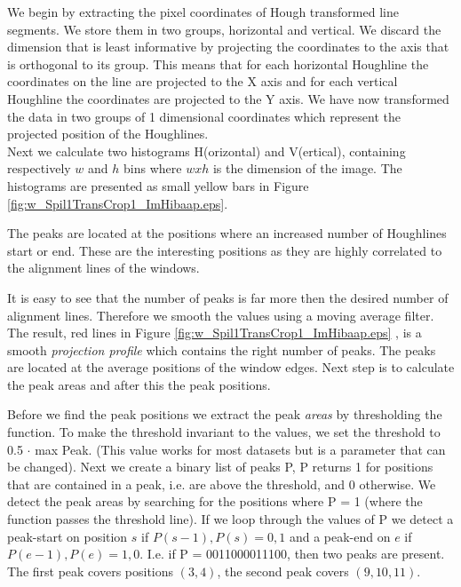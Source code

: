 We begin by extracting the pixel coordinates of Hough transformed line
segments. We store them in two groups, horizontal and vertical.%
We discard the dimension that is least informative by projecting the coordinates to
the axis that is orthogonal to its group. 
This means that for each horizontal Houghline the coordinates on the line are projected to the X
axis and for each vertical Houghline the coordinates are projected to the Y
axis. We have now transformed the data in two groups of 1 dimensional
coordinates which represent the projected position of the Houghlines.\\

Next we calculate two histograms H(orizontal) and V(ertical), containing respectively
$w$ and $h$ bins where $w x h$ is the dimension of the image.  The histograms
are presented as small yellow bars in Figure \ref{fig:w_Spil1TransCrop1_ImHibaap.eps}.

The peaks are located at the positions where an increased number of Houghlines
start or end.  These are the interesting positions as they are highly correlated
to the alignment lines of the windows. 

It is easy to see that the number of peaks is far more then the desired number of alignment lines.
Therefore we smooth the values using a moving average filter.
The result, red lines in Figure \ref{fig:w_Spil1TransCrop1_ImHibaap.eps}
, is a smooth \emph{projection profile} which contains the right number of peaks. The peaks
are located at the average positions of the window edges. Next step is to
calculate the peak areas and after this the peak positions. 

Before we find the peak positions we extract the peak \emph{areas} by thresholding the
function. To make the threshold invariant to the values, we set the threshold to 0.5 $\cdot$ max Peak. 
(This value works for most datasets but is a parameter that can be changed).
Next we create a binary list of peaks P, P returns 1 for positions that are contained in
a peak, i.e. are above the threshold, and 0 otherwise.
We detect the peak areas by searching for the positions where P = 1
(where the function passes the threshold line). 
If we loop through the values of P we detect a peak-start on position $s$ if ${P(s-1),P(s)}={0,1}$
and a peak-end on $e$ if ${P(e-1),P(e)}={1,0}$. 
I.e. if P = 0011000011100, then two peaks are present. The first peak covers positions $(3,4)$, 
the second peak covers $(9,10,11)$.\\

